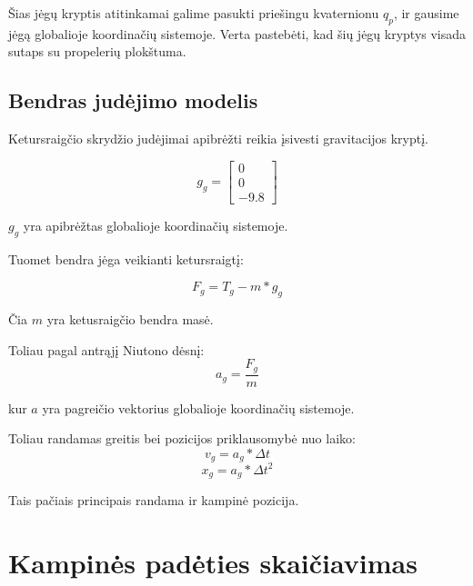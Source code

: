 \documentclass[12pt, a4paper, lithuanian, final]{article}
\begin{document}
Šias jėgų kryptis atitinkamai galime pasukti priešingu kvaternionu $q_{p}$, ir gausime jėgą globalioje koordinačių sistemoje.
Verta pastebėti, kad šių jėgų kryptys visada sutaps su propelerių plokštuma.

\subsection{Bendras judėjimo modelis}

Ketursraigčio skrydžio judėjimai apibrėžti reikia įsivesti gravitacijos kryptį.

\begin{equation}
	g_{g} =  \left[
		\begin{array}{c}
			0 \\
			0 \\
			-9.8
		\end{array}
	\right]
\end{equation}

$g_{g}$ yra apibrėžtas globalioje koordinačių sistemoje.

Tuomet bendra jėga veikianti ketursraigtį:

\begin{equation}
	F_{g} = T_{g} - m*g_{g}
\end{equation}

Čia $m$  yra ketusraigčio bendra masė.

Toliau pagal antrąjį Niutono dėsnį:
\begin{equation}
	a_{g} = \dfrac{F_{g}}{m}
\end{equation}

kur $a$ yra pagreičio vektorius globalioje koordinačių sistemoje.

Toliau randamas greitis bei pozicijos priklausomybė nuo laiko:
\begin{equation}
	v_{g} = a_{g} * \Delta t
\end{equation}
\begin{equation}
	x_{g} = a_{g} * \Delta t ^2
\end{equation}

Tais pačiais principais randama ir kampinė pozicija.







\section{Kampinės padėties skaičiavimas}
\end{document}
